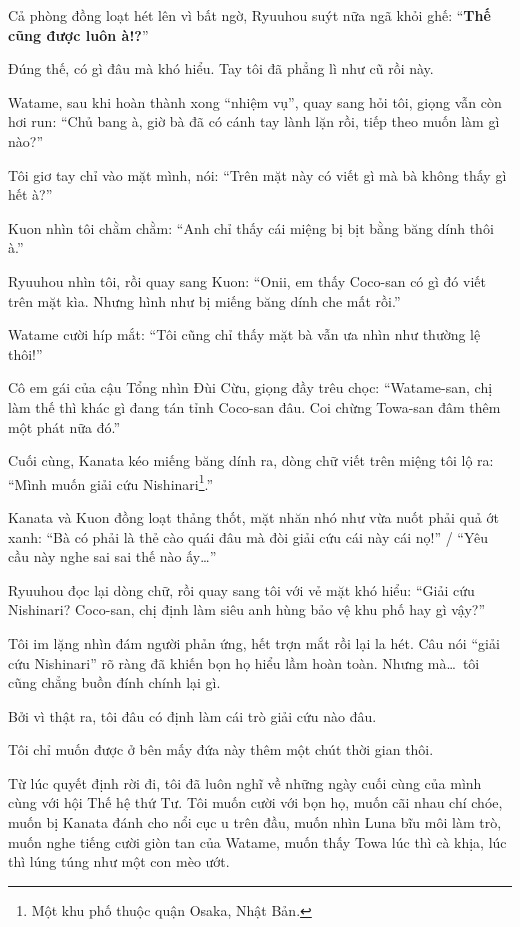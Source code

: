 \documentclass[../main.tex]{subfiles}
\begin{document}
Cả phòng đồng loạt hét lên vì bất ngờ, Ryuuhou suýt nữa ngã khỏi ghế: ``\textbf{Thế cũng được luôn à!?}''

Đúng thế, có gì đâu mà khó hiểu. Tay tôi đã phẳng lì như cũ rồi này.

Watame, sau khi hoàn thành xong ``nhiệm vụ'', quay sang hỏi tôi, giọng vẫn còn hơi run: ``Chủ bang à, giờ bà đã có cánh tay lành lặn rồi, tiếp theo muốn làm gì nào?''

Tôi giơ tay chỉ vào mặt mình, nói: ``Trên mặt này có viết gì mà bà không thấy gì hết à?''

Kuon nhìn tôi chằm chằm: ``Anh chỉ thấy cái miệng bị bịt bằng băng dính thôi à.''

Ryuuhou nhìn tôi, rồi quay sang Kuon: ``Onii, em thấy Coco-san có gì đó viết trên mặt kìa. Nhưng hình như bị miếng băng dính che mất rồi.''

Watame cười híp mắt: ``Tôi cũng chỉ thấy mặt bà vẫn ưa nhìn như thường lệ thôi!''

Cô em gái của cậu Tổng nhìn Đùi Cừu, giọng đầy trêu chọc: ``Watame-san, chị làm thế thì khác gì đang tán tỉnh Coco-san đâu. Coi chừng Towa-san đâm thêm một phát nữa đó.''

Cuối cùng, Kanata kéo miếng băng dính ra, dòng chữ viết trên miệng tôi lộ ra: ``Mình muốn giải cứu Nishinari\footnote{Một khu phố thuộc quận Osaka, Nhật Bản.}.''

Kanata và Kuon đồng loạt thảng thốt, mặt nhăn nhó như vừa nuốt phải quả ớt xanh: ``Bà có phải là thẻ cào quái đâu mà đòi giải cứu cái này cái nọ!'' / ``Yêu cầu này nghe sai sai thế nào ấy\dots''

Ryuuhou đọc lại dòng chữ, rồi quay sang tôi với vẻ mặt khó hiểu: ``Giải cứu Nishinari? Coco-san, chị định làm siêu anh hùng bảo vệ khu phố hay gì vậy?''

Tôi im lặng nhìn đám người phản ứng, hết trợn mắt rồi lại la hét. Câu nói ``giải cứu Nishinari'' rõ ràng đã khiến bọn họ hiểu lầm hoàn toàn. Nhưng mà\dots\ tôi cũng chẳng buồn đính chính lại gì.

Bởi vì thật ra, tôi đâu có định làm cái trò giải cứu nào đâu.

Tôi chỉ muốn được ở bên mấy đứa này thêm một chút thời gian thôi.

Từ lúc quyết định rời đi, tôi đã luôn nghĩ về những ngày cuối cùng của mình cùng với hội Thế hệ thứ Tư. Tôi muốn cười với bọn họ, muốn cãi nhau chí chóe, muốn bị Kanata đánh cho nổi cục u trên đầu, muốn nhìn Luna bĩu môi làm trò, muốn nghe tiếng cười giòn tan của Watame, muốn thấy Towa lúc thì cà khịa, lúc thì lúng túng như một con mèo ướt.
\end{document}
